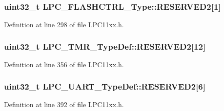 \subsubsection[{\texorpdfstring{R\+E\+S\+E\+R\+V\+E\+D2}{RESERVED2}}]{ uint32\+\_\+t L\+P\+C\+\_\+\+F\+L\+A\+S\+H\+C\+T\+R\+L\+\_\+\+Type\+::\+R\+E\+S\+E\+R\+V\+E\+D2\mbox{[}1\mbox{]}}\hypertarget{group___l_p_c11xx___definitions_gad8b04a97fcb2700fcf92bdc6ec393047}{}\label{group___l_p_c11xx___definitions_gad8b04a97fcb2700fcf92bdc6ec393047}


Definition at line 298 of file L\+P\+C11xx.\+h.

\subsubsection[{\texorpdfstring{R\+E\+S\+E\+R\+V\+E\+D2}{RESERVED2}}]{\setlength{\rightskip}{0pt plus 5cm}uint32\+\_\+t L\+P\+C\+\_\+\+T\+M\+R\+\_\+\+Type\+Def\+::\+R\+E\+S\+E\+R\+V\+E\+D2\mbox{[}12\mbox{]}}\hypertarget{group___l_p_c11xx___definitions_gaf8194b9a61c94110beb56893fbff4947}{}\label{group___l_p_c11xx___definitions_gaf8194b9a61c94110beb56893fbff4947}


Definition at line 356 of file L\+P\+C11xx.\+h.

\subsubsection[{\texorpdfstring{R\+E\+S\+E\+R\+V\+E\+D2}{RESERVED2}}]{\setlength{\rightskip}{0pt plus 5cm}uint32\+\_\+t L\+P\+C\+\_\+\+U\+A\+R\+T\+\_\+\+Type\+Def\+::\+R\+E\+S\+E\+R\+V\+E\+D2\mbox{[}6\mbox{]}}\hypertarget{group___l_p_c11xx___definitions_ga529759b9e0e7aba3cb0e6f2b5c0b93ed}{}\label{group___l_p_c11xx___definitions_ga529759b9e0e7aba3cb0e6f2b5c0b93ed}


Definition at line 392 of file L\+P\+C11xx.\+h.

